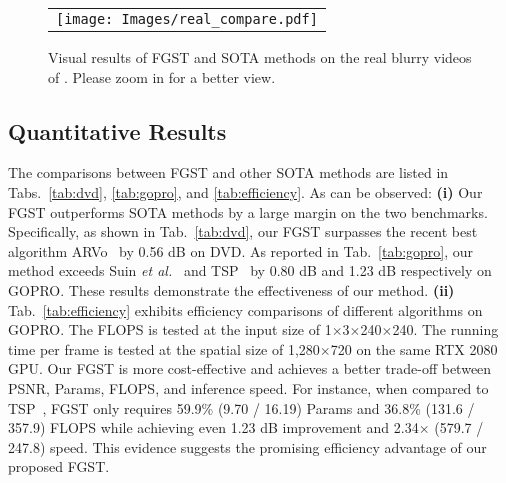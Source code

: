 \documentclass{article}
\begin{document}
	\begin{figure*}[t]
		\begin{center}
			\begin{tabular}[t]{c} \hspace{-2mm}
				\texttt{[image: Images/real\_compare.pdf]}
			\end{tabular}
		\end{center}
		\vspace*{-5mm}
		\caption{\small Visual results of FGST and SOTA methods on the real blurry videos of  \cite{real_blur}. Please zoom in for a better view.}
		\label{fig:real}
		\vspace{-2mm}
	\end{figure*}
	
	\subsection{Quantitative Results}
	\vspace{-1mm}
	The comparisons between FGST and other SOTA methods are listed in Tabs.~\ref{tab:dvd}, \ref{tab:gopro}, and \ref{tab:efficiency}. As can be observed: \textbf{(i)} Our FGST outperforms SOTA methods by a large margin on the two benchmarks. Specifically, as shown in Tab.~\ref{tab:dvd}, our FGST surpasses the recent best algorithm ARVo~\cite{arvo} by 0.56 dB on DVD. As reported in Tab.~\ref{tab:gopro}, our method exceeds Suin \emph{et al.}~\cite{Suin} and TSP~\cite{tsp} by 0.80 dB and 1.23 dB respectively on GOPRO. These results demonstrate the effectiveness of our method. \textbf{(ii)} Tab.~\ref{tab:efficiency} exhibits efficiency comparisons of different algorithms on GOPRO. The FLOPS is tested at the input size of 1$\times$3$\times$240$\times$240. The running time per frame is tested at the spatial size of 1,280$\times$720 on the same RTX 2080 GPU. Our FGST is more cost-effective and achieves a better trade-off between PSNR, Params, FLOPS, and inference speed. For instance, when compared to TSP~\cite{tsp}, FGST only requires 59.9\% (9.70 / 16.19) Params and 36.8\% (131.6 / 357.9) FLOPS while achieving even 1.23 dB improvement and 2.34$\times$ (579.7 / 247.8) speed. This evidence suggests the promising efficiency advantage of our proposed FGST.
	
	\vspace{-1mm}
\end{document}
